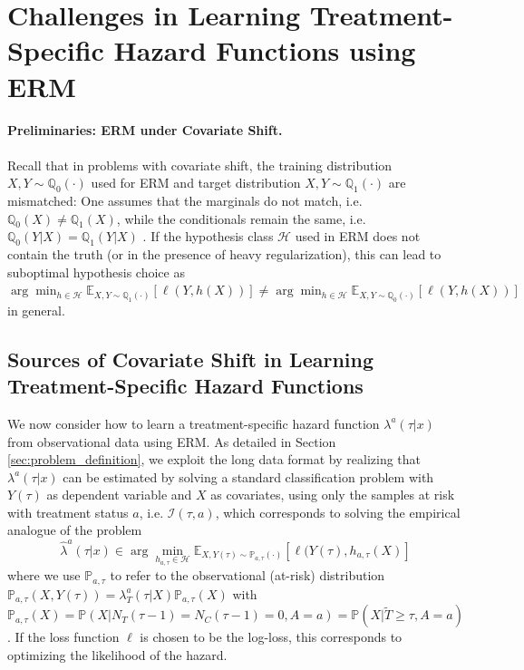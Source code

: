 \documentclass{article}
\newcommand{\minus}{{-}} %
\begin{document}
\section{Challenges in Learning Treatment-Specific Hazard Functions using ERM} 
\paragraph{Preliminaries: ERM under Covariate Shift.} Recall that in problems with covariate shift, the training distribution $X, Y \sim  \mathbb{Q}_0(\cdot)$ used for ERM and target distribution $X, Y \sim  \mathbb{Q}_1(\cdot)$ are mismatched: One assumes that the marginals do not match, i.e. $\mathbb{Q}_0(X) \neq \mathbb{Q}_1(X)$, while the conditionals remain the same, i.e. $\mathbb{Q}_0(Y|X)=\mathbb{Q}_1(Y|X)$ \cite{kouw2018introduction}. If the hypothesis class $\mathcal{H}$ used in ERM does not contain the truth (or in the presence of heavy regularization), this can lead to suboptimal hypothesis choice as $\arg\min_{h \in \mathcal{H}} \mathbb{E}_{X, Y \sim \mathbb{Q}_1(\cdot)}[\ell(Y, h(X))] \neq \arg \min_{h \in \mathcal{H}} \mathbb{E}_{X, Y \sim \mathbb{Q}_0(\cdot)}[\ell(Y, h(X))]$ in general.

\subsection{Sources of Covariate Shift in Learning Treatment-Specific Hazard Functions}
We now consider how to learn a treatment-specific hazard function $\lambda^{a}(\tau|x)$ from observational data using ERM. As detailed in Section \ref{sec:problem_definition},  we exploit the long data format by realizing that $\lambda^{a}(\tau|x)$ can be estimated by solving a standard classification problem with $Y(\tau)$ as dependent variable and $X$ as covariates, using only the samples at risk with treatment status $a$, i.e. $\mathcal{I}(\tau, a)$, which corresponds to solving the empirical analogue of the problem 
\begin{equation}
    \hat{\lambda}^{a}(\tau|x)  \in  \arg \min_{h_{a, \tau} \in \mathcal{H}} \mathbb{E}_{X, Y(\tau) \sim \mathbb{P}_{a, \tau}(\cdot)}[\ell(Y(\tau), h_{a, \tau}(X)]
\end{equation}
where we use $\mathbb{P}_{a, \tau}$ to refer to the observational (at-risk) distribution $\mathbb{P}_{a, \tau}(X, Y(\tau)) = {\lambda}^{a}_T(\tau|X)\mathbb{P}_{a,\tau}(X)$ with $\mathbb{P}_{a,\tau}(X) = \mathbb{P}(X|N_T(\tau\minus1)=N_C(\tau\minus1)= 0, A = a) =  \mathbb{P}(X|\tilde{T}\geq \tau, A= a)$. If the loss function $\ell$ is chosen to be the log-loss, this corresponds to optimizing the likelihood of the hazard. 
\end{document}
